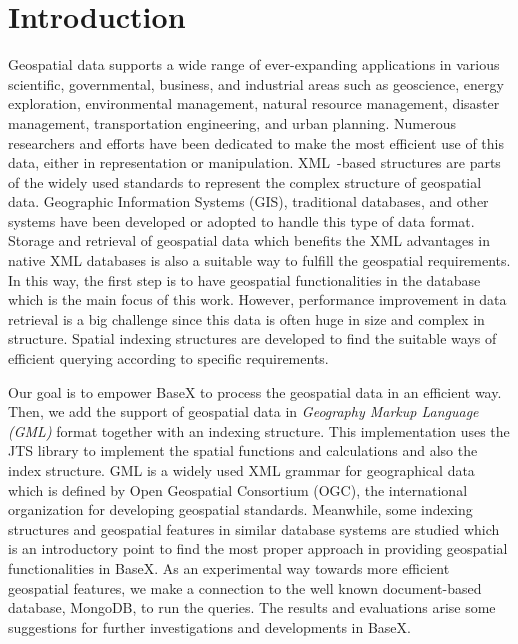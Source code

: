 \documentclass[a4paper,12pt]{article}
\begin{document}
\section{Introduction}
\setcounter{page}{1}
Geospatial data supports a wide range of ever-expanding applications in various scientific, governmental, business, and industrial areas such as geoscience, energy exploration, environmental management, natural resource management, disaster management, transportation engineering, and urban planning. 
Numerous researchers and efforts have been dedicated to make the most efficient use of this data, either in representation or manipulation. 
XML~\cite{www/xml}-based structures are parts of the widely used standards to represent the complex structure of geospatial data. 
Geographic Information Systems (GIS), traditional databases, and other systems have been developed or adopted to handle this type of data format. 
Storage and retrieval of geospatial data which benefits the XML advantages in native XML databases is also a suitable way to fulfill the geospatial requirements. 
In this way, the first step is to have geospatial functionalities in the database which is the main focus of this work.
However, performance improvement in data retrieval is a big challenge since this data is often huge in size and complex in structure. 
Spatial indexing structures are developed to find the suitable ways of efficient querying according to specific requirements. 

Our goal is to empower BaseX to process the geospatial data in an efficient way. 
Then, we add the support of geospatial data in \emph{Geography Markup Language (GML)} format together with an indexing structure. This implementation uses the JTS library to implement the spatial functions and calculations and also the index structure.
GML is a widely used XML grammar for geographical data which is defined by Open Geospatial Consortium (OGC), the international organization for developing geospatial standards.
Meanwhile, some indexing structures and geospatial features in similar database systems are studied which is an introductory point 
to find the most proper approach in providing geospatial functionalities in BaseX. 
As an experimental way towards more efficient geospatial features, 
we make a connection to the well known document-based database, MongoDB, to run the queries. The results and evaluations arise some suggestions for further investigations and developments in BaseX. 
\end{document}

